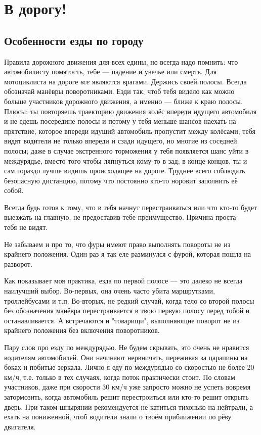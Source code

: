 \documentclass[12pt,a4paper]{article}
\begin{document}
\section{В дорогу!}

\subsection{Особенности езды по городу}

Правила дорожного движения для всех едины, но всегда надо помнить:
что автомобилисту помятость, тебе --- падение и увечье или смерть.
Для мотоциклиста на дороге \emph{все} являются врагами.
Держись своей полосы. Всегда обозначай манёвры поворотниками.
Езди так, чтоб тебя видело как можно больше участников дорожного
движения, а именно --- ближе к краю полосы. Плюсы: ты повторяешь
траекторию движения колёс впереди идущего автомобиля и не едешь
посередине полосы и потому у тебя меньше шансов наехать на прятствие,
которое впереди идущий автомобиль пропустит между колёсами; тебя
видят водители не только впереди и сзади идущего, но многие из
соседней полосы; даже в случае экстренного торможения у тебя
появляется шанс уйти в междурядье, вместо того чтобы ляпнуться
кому-то в зад; в конце-концов, ты и сам гораздо лучше видишь
происходящее на дороге.
Труднее всего соблюдать безопасную дистанцию, потому что постоянно
кто-то норовит заполнить её собой.

Всегда будь готов к тому, что в тебя начнут перестраиваться или
что кто-то будет выезжать на главную, не предоставив тебе
преимущество. Причина проста --- тебя не видят.

Не забываем и про то, что фуры имеют право
выполнять повороты не из крайнего положения. Один раз я так еле
разминулся с фурой, которая пошла на разворот.

Как показывает моя практика, езда по первой полосе --- это далеко
не всегда наилучший выбор. Во-первых, она очень часто убита маршрутками,
троллейбусами и т.п. Во-вторых, не редкий случай, когда тело со второй
полосы без обозначения манёвра перестраивается в твою первую полосу
перед тобой и останавливается. А встречаются и "товарищи", выполняющие
поворот не из крайнего положения без включения поворотников.

Пару слов про езду по междурядью. Не будем скрывать, это очень не
нравится водителям автомобилей. Они начинают нервничать, переживая
за царапины на боках и побитые зеркала. Лично я еду по междурядью со
скоростью не более 20 км/ч, т.е. только в тех случаях, когда поток
практически стоит. По словам участников, даже при скорости 30 км/ч
уже запросто можно не успеть вовремя затормозить, когда автомобиль
решит перестроиться или кто-то решит открыть дверь. При таком
шнырянии рекомендуется не катиться тихонько на нейтрали, а ехать
на пониженной, чтоб водители знали о твоём приближении по рёву
двигателя.
\end{document}
